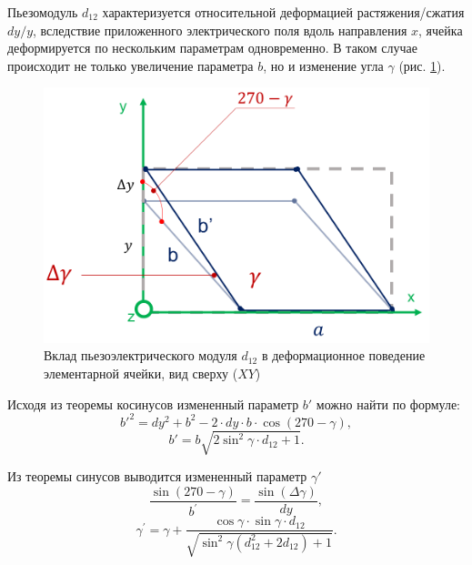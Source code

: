 Пьезомодуль $d_{12}$ характеризуется относительной деформацией растяжения/сжатия $dy/y$,
вследствие приложенного электрического поля вдоль направления $x$,
ячейка деформируется по нескольким параметрам одновременно. В таком случае
происходит не только увеличение
параметра $b$, но и изменение угла $\gamma$ (рис. \ref{ris:d12}).

\begin{figure}[H]
  \centering
  \includegraphics[width=.6\textwidth]{images/d12.png}
  \caption{Вклад пьезоэлектрического модуля $d_{12}$ в деформационное поведение элементарной ячейки, вид сверху ($XY$)}
  \label{ris:d12}
\end{figure}

Исходя из теоремы косинусов измененный параметр $b'$ можно найти по формуле:
\begin{equation}
   b'^2=dy^2+b^2-2 \cdot dy \cdot b \cdot \cos(270-\gamma), \nonumber
   \label{eq:b_formed_1}
\end{equation}
\begin{equation}
   b' = b \sqrt{ 2\sin^2 \gamma \cdot d_{12}+1}.
   \label{eq:b_formed_2}
\end{equation}

Из теоремы синусов выводится измененный параметр $\gamma'$
\begin{equation}
   \frac{\sin(270-\gamma)}{b^{'}} = \frac{\sin (\Delta \gamma)}{dy}, \nonumber
   \label{eq:b_formed_3}
\end{equation}
\begin{equation}
   \gamma^{'} = \gamma + \frac{\cos\gamma \cdot \sin \gamma \cdot d_{12}}{ \sqrt{ \sin^2 \gamma  (d_{12}^2 + 2d_{12})+1}}.
   \label{eq:b_formed_4}
\end{equation}



